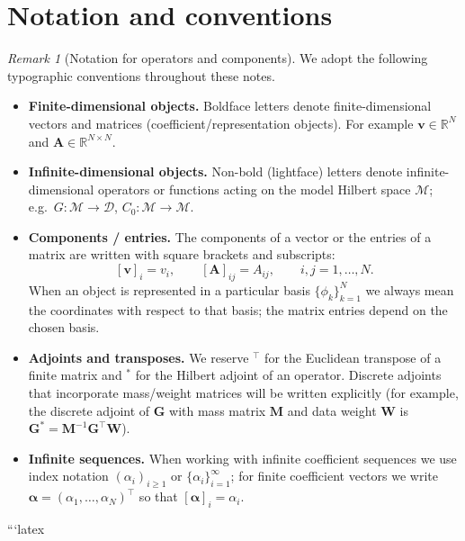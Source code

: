 \documentclass[11pt,openany]{book}
\theoremstyle{definition}
\theoremstyle{remark}
\newtheorem{remark}{Remark}[chapter]
\begin{document}
\section*{Notation and conventions}

\begin{remark}[Notation for operators and components]\label{rem:notation}
  We adopt the following typographic conventions throughout these notes.

  \begin{itemize}
    \item \textbf{Finite-dimensional objects.} Boldface letters denote finite-dimensional vectors and matrices (coefficient/representation objects). For example \(\mathbf{v}\in\mathbb R^N\) and \(\mathbf{A}\in\mathbb R^{N\times N}\).
    \item \textbf{Infinite-dimensional objects.} Non-bold (lightface) letters denote infinite-dimensional operators or functions acting on the model Hilbert space \(\mathcal M\); e.g.\ \(G:\mathcal M\to\mathcal D\), \(C_0:\mathcal M\to\mathcal M\).
    \item \textbf{Components / entries.} The components of a vector or the entries of a matrix are written with square brackets and subscripts:
    \[
      [\mathbf v]_i = v_i,\qquad [\mathbf A]_{ij} = A_{ij},
      \qquad i,j=1,\dots,N.
    \]
    When an object is represented in a particular basis \(\{\phi_k\}_{k=1}^N\) we always mean the coordinates with respect to that basis; the matrix entries depend on the chosen basis.
    \item \textbf{Adjoints and transposes.} We reserve \(^{\top}\) for the Euclidean transpose of a finite matrix and \(^{*}\) for the Hilbert adjoint of an operator. Discrete adjoints that incorporate mass/weight matrices will be written explicitly (for example, the discrete adjoint of \(\mathbf G\) with mass matrix \(\mathbf M\) and data weight \(\mathbf W\) is \(\mathbf G^*=\mathbf M^{-1}\mathbf G^{\top}\mathbf W\)).
    \item \textbf{Infinite sequences.} When working with infinite coefficient sequences we use index notation \( (\alpha_i)_{i\ge1}\) or \(\{\alpha_i\}_{i=1}^\infty\); for finite coefficient vectors we write \(\mathbf\alpha=(\alpha_1,\dots,\alpha_N)^\top\) so that \([\mathbf\alpha]_i=\alpha_i\).
  \end{itemize}
\end{remark}

\mainmatter

```latex
\end{document}
